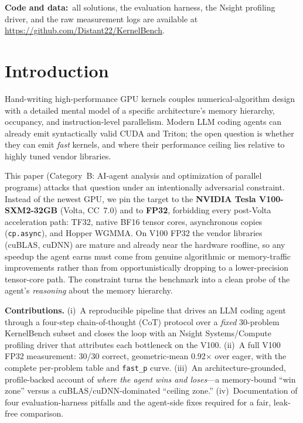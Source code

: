 \documentclass[conference]{IEEEtran}
\begin{document}
\vspace{0.5em}
\noindent{}

\vspace{0.4em}
\noindent\footnotesize\textbf{Code and data:}~all solutions, the evaluation
harness, the Nsight profiling driver, and the raw measurement logs are available
at \url{https://github.com/Distant22/KernelBench}.\normalsize

\section{Introduction}
Hand-writing high-performance GPU kernels couples numerical-algorithm design
with a detailed mental model of a specific architecture's memory hierarchy,
occupancy, and instruction-level parallelism. Modern LLM coding agents can
already emit syntactically valid CUDA and Triton; the open question is whether
they can emit \emph{fast} kernels, and where their performance ceiling lies
relative to highly tuned vendor libraries.

This paper (Category~B: AI-agent analysis and optimization of parallel
programs) attacks that question under an intentionally adversarial constraint.
Instead of the newest GPU, we pin the target to the \textbf{NVIDIA Tesla
V100-SXM2-32GB} (Volta, CC~7.0) and to \textbf{FP32}, forbidding every
post-Volta acceleration path: TF32, native BF16 tensor cores, asynchronous
copies (\texttt{cp.async}), and Hopper WGMMA. On V100 FP32 the vendor libraries
(cuBLAS, cuDNN) are mature and already near the hardware roofline, so any
speedup the agent earns must come from genuine algorithmic or memory-traffic
improvements rather than from opportunistically dropping to a lower-precision
tensor-core path. The constraint turns the benchmark into a clean probe of the
agent's \emph{reasoning} about the memory hierarchy.

\textbf{Contributions.} (i)~A reproducible pipeline that drives an LLM coding
agent through a four-step chain-of-thought (CoT) protocol over a \emph{fixed}
30-problem KernelBench subset and closes the loop with an Nsight
Systems/Compute profiling driver that attributes each bottleneck on the V100.
(ii)~A full V100 FP32 measurement: 30/30 correct, geometric-mean 0.92$\times$
over eager, with the complete per-problem table and \texttt{fast\_p} curve.
(iii)~An architecture-grounded, profile-backed account of \emph{where the agent
wins and loses}---a memory-bound ``win zone'' versus a cuBLAS/cuDNN-dominated
``ceiling zone.'' (iv)~Documentation of four evaluation-harness pitfalls and the
agent-side fixes required for a fair, leak-free comparison.
\end{document}
